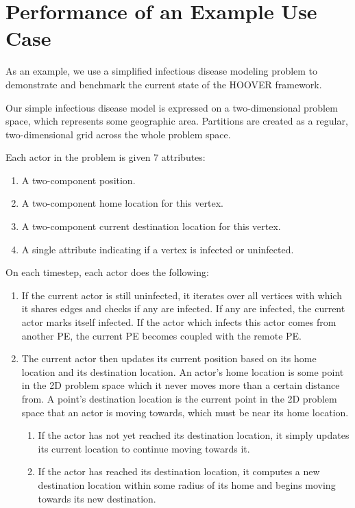 \section{Performance of an Example Use Case}

As an example, we use a simplified infectious disease modeling problem to
demonstrate and benchmark the current state of the HOOVER framework.

Our simple infectious disease model is expressed on a two-dimensional problem
space, which represents some geographic area. Partitions are created as a
regular, two-dimensional grid across the whole problem space.

Each actor in the problem is given 7 attributes:

\begin{enumerate}
    \item A two-component position.
    \item A two-component home location for this vertex.
    \item A two-component current destination location for this vertex.
    \item A single attribute indicating if a vertex is infected or uninfected.
\end{enumerate}

On each timestep, each actor does the following:

\begin{enumerate}
    \item If the current actor is still uninfected, it iterates over all
        vertices with which it shares edges and checks if any are infected. If
        any are infected, the current actor marks itself infected. If the actor
        which infects this actor comes from another PE, the current PE becomes
        coupled with the remote PE.
    \item The current actor then updates its current position based on its home
        location and its destination location. An actor's home location is some
        point in the 2D problem space which it never moves more than a certain
        distance from. A point's destination location is the current point in
        the 2D problem space that an actor is moving towards, which must be near
        its home location.
        \begin{enumerate}
            \item If the actor has not yet reached its destination location, it
                simply updates its current location to continue moving towards
                it.
            \item If the actor has reached its destination location, it
                computes a new destination location within some radius of its
                home and begins moving towards its new destination.
        \end{enumerate}
\end{enumerate}

